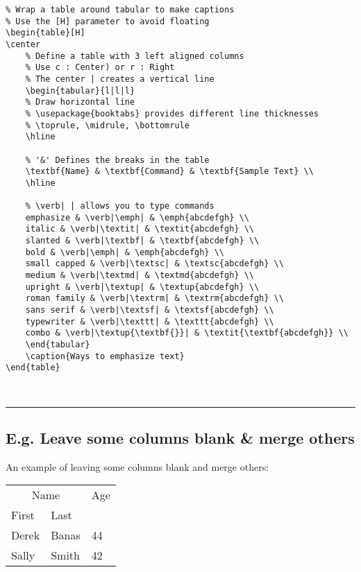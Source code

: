 \documentclass[a4paper,12pt,titlepage]{article}
\begin{document}
\begin{lstlisting}  
% Wrap a table around tabular to make captions
% Use the [H] parameter to avoid floating
\begin{table}[H]
\center
	% Define a table with 3 left aligned columns 
	% Use c : Center) or r : Right
	% The center | creates a vertical line
	\begin{tabular}{l|l|l}
	% Draw horizontal line
	% \usepackage{booktabs} provides different line thicknesses
	% \toprule, \midrule, \bottomrule
	\hline
	
	% '&' Defines the breaks in the table
	\textbf{Name} & \textbf{Command} & \textbf{Sample Text} \\
	\hline
	
	% \verb| | allows you to type commands
	emphasize & \verb|\emph| & \emph{abcdefgh} \\
	italic & \verb|\textit| & \textit{abcdefgh} \\
	slanted & \verb|\textbf| & \textbf{abcdefgh} \\
	bold & \verb|\emph| & \emph{abcdefgh} \\
	small capped & \verb|\textsc| & \textsc{abcdefgh} \\
	medium & \verb|\textmd| & \textmd{abcdefgh} \\
	upright & \verb|\textup| & \textup{abcdefgh} \\
	roman family & \verb|\textrm| & \textrm{abcdefgh} \\
	sans serif & \verb|\textsf| & \textsf{abcdefgh} \\
	typewriter & \verb|\texttt| & \texttt{abcdefgh} \\
	combo & \verb|\textup{\textbf{}}| & \textit{\textbf{abcdefgh}} \\
	\end{tabular}
	\caption{Ways to emphasize text}
\end{table}
\end{lstlisting}  
~\\
\rule{\linewidth}{0.1mm}




\subsection{E.g. Leave some columns blank \& merge others}
An example of leaving some columns blank and merge others:
\\
\begin{table}[H]
\center
\begin{tabular}{@{}*3l@{}}
\multicolumn{2}{c}{Name} &
\multicolumn{1}{c}{Age}\\
First & Last & \\
\hline
Derek & Banas & 44\\
Sally & Smith & 42\\
\end{tabular}
\end{table}
~\\
\end{document}

